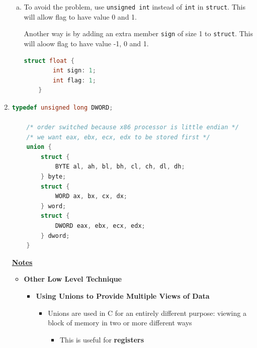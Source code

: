 \documentclass[12pt]{article}
\begin{document}
\begin{enumerate}[1.]
\begin{mdframed}
\begin{enumerate}[a)]
        \item

        To avoid the problem, use \texttt{unsigned int} instead of \texttt{int} in \texttt{struct}.
        \color{red}This will allow flag to have value 0 and 1\color{black}.

        \bigskip

        \color{red}Another way is by adding an extra member \texttt{sign} of size 1 to \texttt{struct}.
        This will aloow flag to have value -1, 0 and 1.

        \bigskip

\begin{lstlisting}[language=c]
    struct float {
        int sign: 1;
        int flag: 1;
    }
\end{lstlisting}
    \end{enumerate}
    \end{mdframed}

    \item

\begin{lstlisting}[language=c]
    typedef unsigned long DWORD;

    /* order switched because x86 processor is little endian */
    /* we want eax, ebx, ecx, edx to be stored first */
    union {
        struct {
            BYTE al, ah, bl, bh, cl, ch, dl, dh;
        } byte;
        struct {
            WORD ax, bx, cx, dx;
        } word;
        struct {
            DWORD eax, ebx, ecx, edx;
        } dword;
    }
\end{lstlisting}

    \bigskip

    \underline{\textbf{Notes}}

    \begin{itemize}
        \item \textbf{Other Low Level Technique}

        \begin{itemize}
            \item \textbf{Using Unions to Provide Multiple Views of Data}

            \begin{itemize}
                \item Unions are used in C for an entirely different purpose:
                viewing a block of memory in two or more different ways

                \begin{itemize}
                    \item This is useful for \textbf{registers}
                \end{itemize}


\end{itemize}
\end{itemize}
\end{itemize}
\end{enumerate}
\end{document}
